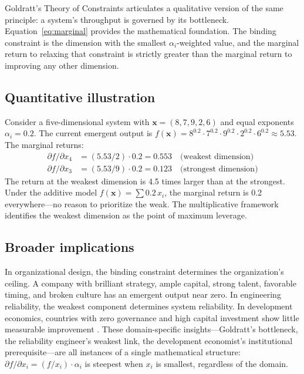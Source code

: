\documentclass[12pt, a4paper]{article}
\theoremstyle{definition}
\theoremstyle{remark}
\begin{document}
Goldratt's Theory of Constraints \cite{goldratt1984} articulates a qualitative version of the same principle: a system's throughput is governed by its bottleneck. Equation~\eqref{eq:marginal} provides the mathematical foundation. The binding constraint is the dimension with the smallest $\alpha_i$-weighted value, and the marginal return to relaxing that constraint is strictly greater than the marginal return to improving any other dimension.

\subsection{Quantitative illustration}

Consider a five-dimensional system with $\mathbf{x} = (8, 7, 9, 2, 6)$ and equal exponents $\alpha_i = 0.2$. The current emergent output is $f(\mathbf{x}) = 8^{0.2} \cdot 7^{0.2} \cdot 9^{0.2} \cdot 2^{0.2} \cdot 6^{0.2} \approx 5.53$. The marginal returns:
\begin{align*}
\partial f / \partial x_4 &= (5.53 / 2) \cdot 0.2 = 0.553 \quad \text{(weakest dimension)} \\
\partial f / \partial x_3 &= (5.53 / 9) \cdot 0.2 = 0.123 \quad \text{(strongest dimension)}
\end{align*}
The return at the weakest dimension is 4.5 times larger than at the strongest. Under the additive model $f(\mathbf{x}) = \sum 0.2 \, x_i$, the marginal return is 0.2 everywhere---no reason to prioritize the weak. The multiplicative framework identifies the weakest dimension as the point of maximum leverage.

\subsection{Broader implications}

In organizational design, the binding constraint determines the organization's ceiling. A company with brilliant strategy, ample capital, strong talent, favorable timing, and broken culture has an emergent output near zero. In engineering reliability, the weakest component determines system reliability. In development economics, countries with zero governance and high capital investment show little measurable improvement \cite{easterly2006}. These domain-specific insights---Goldratt's bottleneck, the reliability engineer's weakest link, the development economist's institutional prerequisite---are all instances of a single mathematical structure: $\partial f / \partial x_i = (f / x_i) \cdot \alpha_i$ is steepest when $x_i$ is smallest, regardless of the domain.
\end{document}
